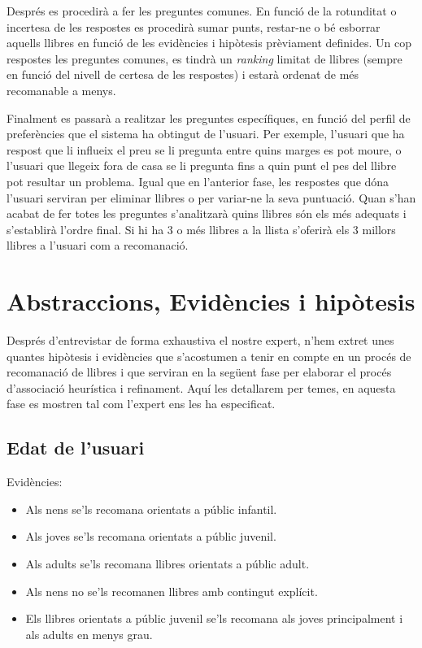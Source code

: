 Després es procedirà a fer les preguntes comunes. En funció de la rotunditat o incertesa de les respostes es procedirà sumar punts, restar-ne o bé esborrar aquells llibres en funció de les evidències i hipòtesis prèviament definides. Un cop respostes les preguntes comunes, es tindrà un \emph{ranking} limitat de llibres (sempre en funció del nivell de certesa de les respostes) i estarà ordenat de més recomanable a menys.

Finalment es passarà a realitzar les preguntes específiques, en funció del perfil de preferències que el sistema ha obtingut de l'usuari. Per exemple, l'usuari que ha respost que li influeix el preu se li pregunta entre quins marges es pot moure, o l'usuari que llegeix fora de casa se li pregunta fins a quin punt el pes del llibre pot resultar un problema. Igual que en l'anterior fase, les respostes que dóna l'usuari serviran per eliminar llibres o per variar-ne la seva puntuació. Quan s'han acabat de fer totes les preguntes s'analitzarà quins llibres són els més adequats i s'establirà l'ordre final. Si hi ha 3 o més llibres a la llista s'oferirà els 3 millors llibres a l'usuari com a recomanació.


\section{Abstraccions, Evidències i hipòtesis}

Després d'entrevistar de forma exhaustiva el nostre expert, n'hem extret unes quantes hipòtesis i evidències que s'acostumen a tenir en compte en un procés de recomanació de llibres i que serviran en la següent fase per elaborar el procés d'associació heurística i refinament. Aquí les detallarem per temes, en aquesta fase es mostren tal com l'expert ens les ha especificat.

\subsection{Edat de l'usuari}
Evidències:
\begin{itemize}
  \item Als nens se'ls recomana orientats a públic infantil.
  \item Als joves se'ls recomana orientats a públic juvenil.  
  \item Als adults se'ls recomana llibres orientats a públic adult.
  \item Als nens no se'ls recomanen llibres amb contingut explícit.
  \item Els llibres orientats a públic juvenil se'ls recomana als joves principalment i als adults en menys grau.
\end{itemize}


